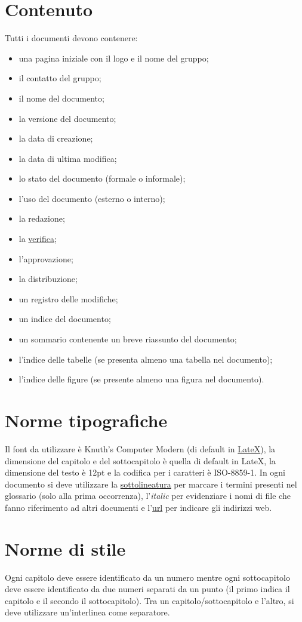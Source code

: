 \section{Contenuto}
Tutti i documenti devono contenere: 
\begin{itemize}
\item {una pagina iniziale con il logo e il nome del gruppo;}
\item {il contatto del gruppo;}
\item {il nome del documento;}
\item {la versione del documento;}
\item {la data di creazione;}
\item {la data di ultima modifica;}
\item {lo stato del documento (formale o informale);}
\item {l'uso del documento (esterno o interno);}
\item {la redazione;}
\item {la \underline{verifica};}
\item {l'approvazione;}
\item {la distribuzione;}
\item {un registro delle modifiche;}
\item {un indice del documento;}
\item {un sommario contenente un breve riassunto del documento;}
\item {l'indice delle tabelle (se presenta almeno una tabella nel documento);}
\item {l'indice delle figure (se presente almeno una figura nel documento).}
\end{itemize} 

\section{Norme tipografiche}
Il font da utilizzare \`e Knuth's Computer Modern (di default in
\underline{LateX}), la dimensione del capitolo e del sottocapitolo \`e quella di
default in LateX, la dimensione del testo \`e 12pt e la codifica per i caratteri
\`e ISO-8859-1. In ogni documento si deve utilizzare la \underline{sottolineatura} per marcare i termini presenti nel glossario (solo
alla prima occorrenza), l'\emph{italic} per evidenziare i nomi di file che
fanno riferimento ad altri documenti e l'\url{url} per indicare gli indirizzi
web.

\section{Norme di stile}
Ogni capitolo deve essere identificato da un numero mentre ogni sottocapitolo
deve essere identificato da due numeri separati da un punto (il primo indica il
capitolo e il secondo il sottocapitolo). Tra un capitolo/sottocapitolo e
l'altro, si deve utilizzare un'interlinea come separatore.

